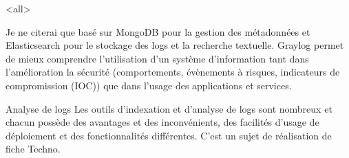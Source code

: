 \mode<all>{}


Je ne citerai que  basé sur MongoDB pour la gestion des métadonnées et Elasticsearch pour le stockage des logs et la recherche textuelle. Graylog  permet de mieux comprendre l’utilisation d'un système d'information tant dans l'amélioration la sécurité (comportements, évènements à risques, indicateurs de compromission (IOC)) que dans l'usage des applications et services.


\begin{warningbox}{Analyse de logs}
	Les outils d'indexation et d'analyse de logs sont nombreux et chacun possède des avantages et des inconvénients, des facilités d'usage de déploiement et des fonctionnalités différentes. C'est un sujet de réalisation de fiche Techno.
\end{warningbox}






